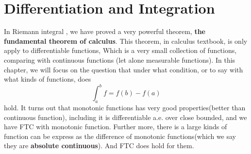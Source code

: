 \documentclass[lang=en, 12pt]{elegantbook}
\begin{document}
\chapter{Differentiation and Integration}
    In Riemann integral , we have proved a very powerful theorem, \textbf{the fundamental theorem of calculus}. This theorem, in calculus
textbook, is only apply to differentiable functions, Which is a very small collection of functions, comparing with continuous functions
(let alone measurable functions). In this chapter, we will focus on the question that under what condition, or to say with what kinds of 
functions, does 
$$\int_a^b f = f(b) - f(a)$$
hold. It turns out that monotonic functions has very good properties(better than continuous function), including it is differentiable a.e. over
close bounded, and we have FTC with monotonic function. Further more, there is a large kinds of function can be express as the difference 
of monotonic functions(which we say they are \textbf{absolute continuous}). And FTC does hold for them.
\end{document}
